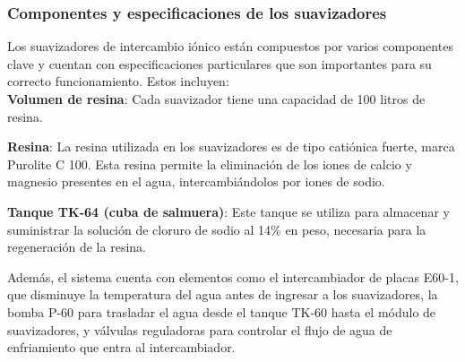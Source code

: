 \subsubsection{Componentes y especificaciones de los suavizadores}

Los suavizadores de intercambio iónico están compuestos por varios componentes clave y cuentan con especificaciones particulares que son importantes para su correcto funcionamiento. Estos incluyen:\\

\textbf{Volumen de resina}: Cada suavizador tiene una capacidad de 100 litros de resina.

\textbf{Resina}: La resina utilizada en los suavizadores es de tipo catiónica fuerte, marca Purolite C 100. Esta resina permite la eliminación de los iones de calcio y magnesio presentes en el agua, intercambiándolos por iones de sodio.

\textbf{Tanque TK-64 (cuba de salmuera)}: Este tanque se utiliza para almacenar y suministrar la solución de cloruro de sodio al 14\% en peso, necesaria para la regeneración de la resina.

Además, el sistema cuenta con elementos como el intercambiador de placas E60-1, que disminuye la temperatura del agua antes de ingresar a los suavizadores, la bomba P-60 para trasladar el agua desde el tanque TK-60 hasta el módulo de suavizadores, y válvulas reguladoras para controlar el flujo de agua de enfriamiento que entra al intercambiador.
